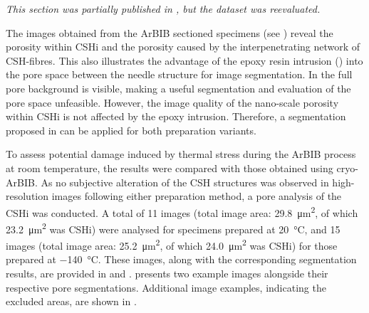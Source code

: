 \textit{This section was partially published in \cite{kleiner.2021a}, but the dataset was reevaluated.}

The images obtained from the \ac{ArBIB} sectioned specimens (see ) reveal the porosity within \ac{CSHi} and the porosity caused by the interpenetrating network of \ac{CSH}-fibres.
This also illustrates the advantage of the epoxy resin intrusion () into the pore space between the needle structure for image segmentation.
In  the full pore background is visible, making a useful segmentation and evaluation of the pore space unfeasible.
However, the image quality of the nano-scale porosity within \ac{CSHi} is not affected by the epoxy intrusion.
Therefore, a segmentation proposed in  can be applied for both preparation variants.

To assess potential damage induced by thermal stress during the \ac{ArBIB} process at room temperature, the results were compared with those obtained using cryo-\ac{ArBIB}.
As no subjective alteration of the \ac{CSH} structures was observed in high-resolution images following either preparation method, a pore analysis of the \ac{CSHi} was conducted.
A total of \num{11} images (total image area: \qty{29.8}{\micro\meter\squared}, of which \qty{23.2}{\micro\meter\squared} was \ac{CSHi}) were analysed for specimens prepared at \qty{20}{\celsius}, and \num{15} images (total image area: \qty{25.2}{\micro\meter\squared}, of which \qty{24.0}{\micro\meter\squared} was \ac{CSHi}) for those prepared at \qty{-140}{\celsius}.
These images, along with the corresponding segmentation results, are provided in  and \cite{kleiner.2021g,kleiner.2021h}.
 presents two example images alongside their respective pore segmentations.
Additional image examples, indicating the excluded areas, are shown in .


